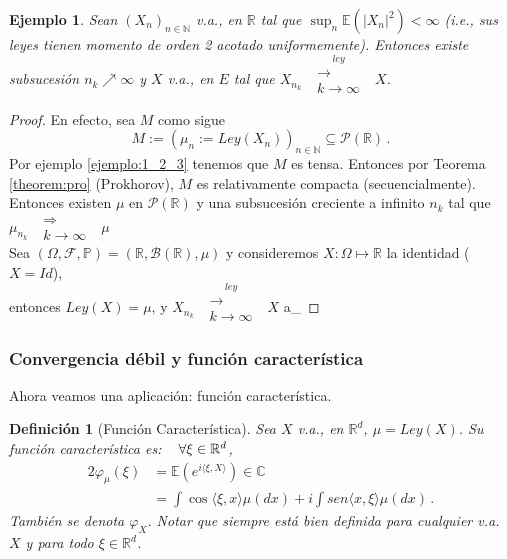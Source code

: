 \documentclass[letterpaper,11pt]{article} %
\def\espacio{\hspace{.25cm}\,}
\theoremstyle{defbreak}
\newtheorem{definition}{Definición}[subsection]
\newtheorem{example}{Ejemplo}[subsection]
\theoremstyle{propbreak}
\theoremstyle{remark}
\theoremstyle{break}
\def\R{\mathbb{R}}
\def\N{\mathbb{N}}
\def\edp{(\Omega,\mathcal{F},\mathbb{P})}
\def\gris{\color{mygray}}
\def\negro{\color{black}}
\def\findem{\null\hfill\color{white}a\color{black}_\square}
\begin{document}
\begin{example}
Sean $(X_n)_{n\in\mathbb{N}}$ v.a., en $\mathbb{R}$ tal que $\displaystyle\sup_n\mathbb{E}(|X_n|^2)<\infty$ (i.e., sus leyes tienen momento de orden 2 acotado uniformemente). Entonces existe subsucesión $n_k\nearrow\infty$ y $X$ v.a., en $E$ tal que $X_{n_k}\mbox{ }\overset{ley}{\substack{\longrightarrow \\k \to \infty}}\mbox{ }X$.
\end{example}
\begin{proof}
\gris En efecto, sea $M$ como sigue
$$ M:=(\mu_n:=Ley(X_n))_{n\in\N}\subseteq\mathcal{P}(\R) \, .$$
Por ejemplo \ref{ejemplo:1_2_3} tenemos que $M$ es tensa. Entonces por Teorema \ref{theorem:pro} (Prokhorov), $M$ es relativamente compacta (secuencialmente). Entonces existen $\mu$ en $\mathcal{P}(\R)$ y una subsucesión creciente a infinito $n_k$ tal que $\mu_{n_k}\mbox{ }\substack{\Longrightarrow \\k \to \infty}\mbox{ } \mu$ 
\\ Sea $\edp = (\R,\mathcal{B}(\R),\mu)$ y consideremos $X:\Omega\mapsto\R$ la identidad ($X=Id$), \\ entonces $Ley(X)=\mu$, y $X_{n_k}\mbox{ }\overset{ley}{\substack{\longrightarrow \\k \to \infty}}\mbox{ } X$
\findem
\negro
\end{proof}

\subsubsection{Convergencia débil y función característica}
Ahora veamos una aplicación: función característica.

\begin{definition}[Función Característica]
Sea $X$ v.a., en $\mathbb{R}^d$, $\mu=Ley(X)$. Su función característica es: $ \espacio \forall \xi\in\mathbb{R}^d$,
\begin{alignat*}{2}
    \varphi_\mu(\xi) & = \mathbb{E}(e^{i\langle\xi,X\rangle}) \in\mathbb{C} \\
     & =\int \cos\langle\xi,x\rangle\mu(dx) +i\int sen\langle x,\xi\rangle\mu(dx) \, .
\end{alignat*}
También se denota $\varphi_X$. Notar que siempre está bien definida para cualquier v.a. $X$ y para todo $\xi\in\R^d$.
\end{definition} 
\end{document}
